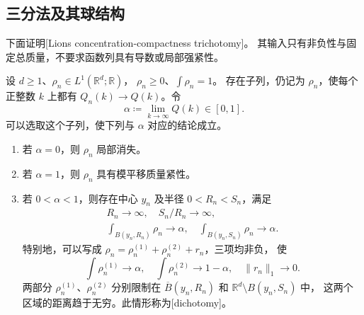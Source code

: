 \subsection{三分法及其球结构}
\label{b2:subsec:F0202}

下面证明[Lions concentration-compactness trichotomy]。
其输入只有非负性与固定总质量，不要求函数列具有导数或局部强紧性。

\begin{theorem}
\label{b2:thm:F-trichotomy}
设 \(d\ge1\)、\(\rho_n\in L^1(\mathbb R^d;\mathbb R)\)，
\(\rho_n\ge0\)、\(\int\rho_n=1\)。
存在子列，仍记为 \(\rho_n\)，使每个正整数 \(k\) 上都有
\(Q_n(k)\to Q(k)\)。令
\[
 \alpha\coloneqq\lim_{k\to\infty}Q(k)\in[0,1].
\]
可以选取这个子列，使下列与 \(\alpha\) 对应的结论成立。
\begin{enumerate}
\item\label{b2:item:F-trichotomy-vanishing}
若 \(\alpha=0\)，则 \(\rho_n\) 局部消失。
\item\label{b2:item:F-trichotomy-tightness}
若 \(\alpha=1\)，则 \(\rho_n\) 具有模平移质量紧性。
\item\label{b2:item:F-trichotomy-splitting}
若 \(0<\alpha<1\)，则存在中心 \(y_n\) 及半径 \(0<R_n<S_n\)，满足
\begin{equation}
 \label{b2:eq:F-splitting-balls}
 \begin{gathered}
 R_n\longrightarrow\infty,\quad S_n/R_n\longrightarrow\infty,\\
 \int_{B(y_n,R_n)}\rho_n\longrightarrow\alpha,
 \quad
 \int_{B(y_n,S_n)}\rho_n\longrightarrow\alpha.
 \end{gathered}
\end{equation}
特别地，可以写成 \(\rho_n=\rho_n^{(1)}+\rho_n^{(2)}+r_n\)，三项均非负，
使
\[
 \int\rho_n^{(1)}\longrightarrow\alpha,
 \quad \int\rho_n^{(2)}\longrightarrow1-\alpha,
 \quad \|r_n\|_1\longrightarrow0.
\]
两部分 \(\rho_n^{(1)}\)、\(\rho_n^{(2)}\) 分别限制在
\(\overline B(y_n,R_n)\) 和 \(\mathbb R^d\setminus B(y_n,S_n)\) 中，
这两个区域的距离趋于无穷。此情形称为[dichotomy]。
\end{enumerate}
\end{theorem}

